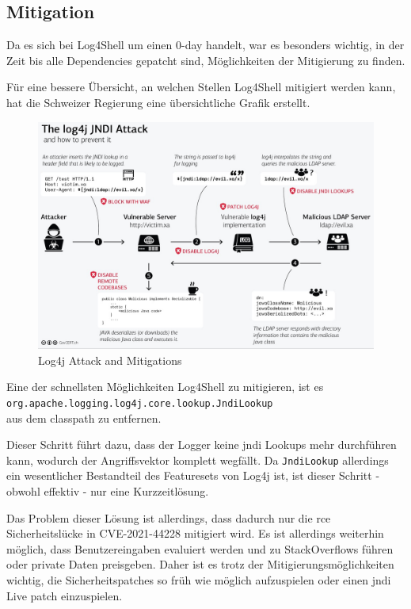 
\clearpage
\subsection{Mitigation}\label{subsec:mitigation}
Da es sich bei Log4Shell um einen 0-day handelt, war es besonders wichtig, in der Zeit bis alle Dependencies gepatcht sind, Möglichkeiten der Mitigierung zu finden.

Für eine bessere Übersicht, an welchen Stellen Log4Shell mitigiert werden kann, hat die Schweizer Regierung eine übersichtliche Grafik erstellt.

\begin{figure}[!htb]\label{fig:log4jattackgraphic}
    \begin{center}
        \includegraphics[width=\textwidth]{images/log4j_attack}
    \end{center}
    \caption{Log4j Attack and Mitigations}
\end{figure}

Eine der schnellsten Möglichkeiten Log4Shell zu mitigieren, ist es
\\ \verb|org.apache.logging.log4j.core.lookup.JndiLookup|\\
aus dem classpath zu entfernen.

Dieser Schritt führt dazu, dass der Logger keine \gls{jndi} Lookups mehr durchführen kann, wodurch der Angriffsvektor komplett wegfällt.
Da \verb|JndiLookup| allerdings ein wesentlicher Bestandteil des Featuresets von Log4j ist, ist dieser Schritt - obwohl effektiv - nur eine Kurzzeitlösung.

Das Problem dieser Lösung ist allerdings, dass dadurch nur die \gls{rce} Sicherheitslücke in CVE-2021-44228 mitigiert wird.
Es ist allerdings weiterhin möglich, dass Benutzereingaben evaluiert werden und zu StackOverflows führen oder private Daten preisgeben.
Daher ist es trotz der Mitigierungsmöglichkeiten wichtig, die Sicherheitspatches so früh wie möglich aufzuspielen oder einen \gls{jndi} Live patch einzuspielen.
